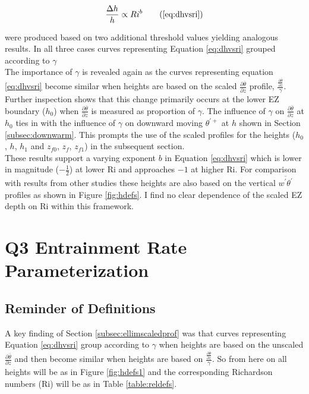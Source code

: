 \begin{equation}
\frac{\Delta h}{h} \propto Ri ^{b} \tag{\ref{eq:dhvsri}}
\end{equation}

were produced based on two additional threshold values yielding analogous results.  In all three cases curves representing Equation \ref{eq:dhvsri} grouped according to $\gamma$\\

The importance of $\gamma$ is revealed again as the curves representing equation \ref{eq:dhvsri} become similar when heights are based on the scaled $\frac{\partial \overline{\theta}}{\partial z}$ profile, $\frac{\frac{\partial \overline{\theta}}{\partial z}}{\gamma}$. Further inspection shows that this change primarily occurs at the lower \acs{EZ} boundary ($h_{0}$) when $\frac{\partial \overline{\theta}}{\partial z}$ is measured as proportion of $\gamma$. The influence of $\gamma$ on $\frac{\partial \overline{\theta}}{\partial z}$ at $h_{0}$ ties in with the influence of $\gamma$ on downward moving $\theta^{'+}$ at $h$ shown in Section \ref{subsec:downwarm}.  This prompts the use of the scaled profiles for the heights ($h_{0}$, $h$, $h_{1}$ and $z_{f0}$, $z_{f}$, $z_{f1}$) in the subsequent section.\\

These results support a varying exponent $b$ in Equation \ref{eq:dhvsri} which is lower in magnitude ($-\frac{1}{2}$) at lower \acs{Ri} and approaches $-1$ at higher \acs{Ri}.  For comparison with results from other studies these heights are also based on the vertical $\overline{w^{'}\theta^{'}}$ profiles as shown in Figure \ref{fig:hdefs}. I find no clear dependence of the scaled \acs{EZ} depth on \acs{Ri} within this framework. \\

\clearpage

\section{Q3 Entrainment Rate Parameterization}
\label{sec:weri}
\FloatBarrier


\subsection{Reminder of Definitions}

A key finding of Section \ref{subsec:ellimscaledprof} was that curves representing Equation \ref{eq:dhvsri} group according
to $\gamma$ when heights are based on the unscaled $\frac{\partial \overline{\theta}}{\partial z}$ and then become similar
when heights are based on $\frac{\frac{\partial \overline{\theta}}{\partial z}}{\gamma}$.  So from here on all heights will be as in
Figure \ref{fig:hdefs1} and the corresponding Richardson numbers (\acs{Ri}) will be as in Table \ref{table:reldefs}.\\ 

